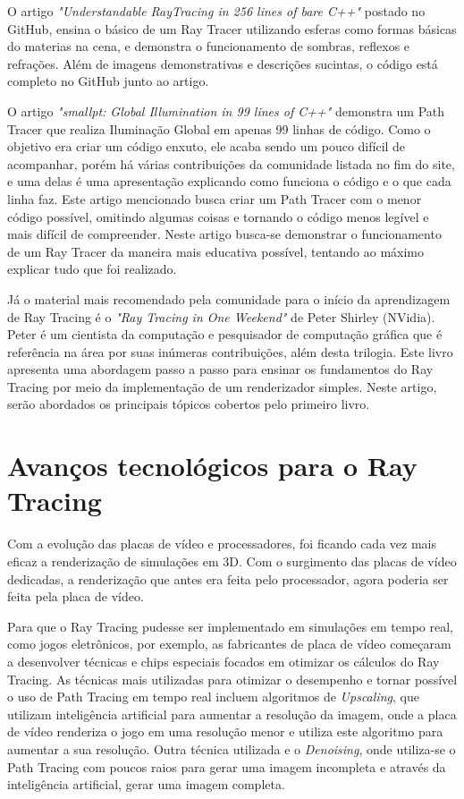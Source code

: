 \documentclass[journal]{IEEEtran}
\begin{document}
O artigo
\emph{"Understandable RayTracing in 256 lines of bare C++"}\cite{c14} postado no GitHub,
ensina o básico de um Ray Tracer utilizando esferas como formas básicas do materias
na cena, e demonstra o funcionamento de sombras, reflexos e refrações. Além de imagens
demonstrativas e descrições sucintas, o código está completo no GitHub junto ao artigo.

O artigo \emph{"smallpt: Global Illumination in 99 lines of C++"} \cite{c13} demonstra 
um Path Tracer que realiza Iluminação Global em apenas 99 linhas de código. Como o 
objetivo era criar um código enxuto, ele acaba sendo um pouco difícil de acompanhar,
porém há várias contribuições da comunidade listada no fim do site, e uma delas é
uma apresentação explicando como funciona o código e o que cada linha faz. Este artigo
mencionado busca criar um Path Tracer com o menor código possível, omitindo algumas
coisas e tornando o código menos legível e mais difícil de compreender. Neste artigo
busca-se demonstrar o funcionamento de um Ray Tracer da maneira mais educativa possível,
tentando ao máximo explicar tudo que foi realizado.

Já o material mais recomendado pela comunidade para o início da aprendizagem de Ray Tracing
é o \emph{"Ray Tracing in One Weekend"} \cite{Shirley2020RTW1} de Peter Shirley (NVidia).
Peter é um cientista da computação e pesquisador de computação gráfica que é referência
na área por suas inúmeras contribuições\cite{shirley-curriculum}, além desta trilogia.
Este livro apresenta uma abordagem passo a passo para ensinar os fundamentos do Ray Tracing
por meio da implementação de um renderizador simples. Neste artigo, serão abordados
os principais tópicos cobertos pelo primeiro livro.

\section{Avanços tecnológicos para o Ray Tracing}
Com a evolução das placas de vídeo e processadores, foi ficando cada vez mais
eficaz a renderização de simulações em 3D. Com o surgimento das placas de vídeo
dedicadas, a renderização que antes era feita pelo processador, agora poderia
ser feita pela placa de vídeo.

Para que o Ray Tracing pudesse ser implementado em simulações em tempo real,
como jogos eletrônicos, por exemplo, as fabricantes de placa de vídeo começaram
a desenvolver técnicas e chips especiais focados em otimizar os cálculos do Ray 
Tracing. As técnicas mais utilizadas para otimizar o desempenho e tornar possível
o uso de Path Tracing em tempo real incluem algoritmos de \emph{Upscaling}, que 
utilizam inteligência artificial para aumentar a resolução da imagem, onde a 
placa de vídeo renderiza o jogo em uma resolução menor e utiliza este algoritmo
para aumentar a sua resolução. Outra técnica utilizada e o \emph{Denoising},
onde utiliza-se o Path Tracing com poucos raios para gerar uma imagem incompleta
e através da inteligência artificial, gerar uma imagem completa.
\end{document}
